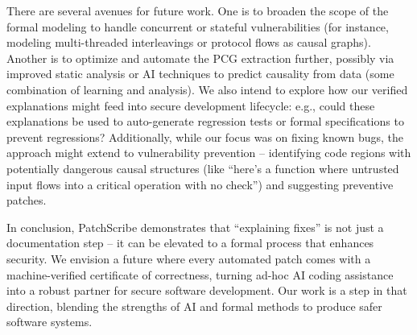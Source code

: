 \documentclass[conference,compsoc]{IEEEtran}
\begin{document}
There are several avenues for future work. One is to broaden the scope
of the formal modeling to handle concurrent or stateful vulnerabilities
(for instance, modeling multi-threaded interleavings or protocol flows
as causal graphs). Another is to optimize and automate the PCG
extraction further, possibly via improved static analysis or AI
techniques to predict causality from data (some combination of learning
and analysis). We also intend to explore how our verified explanations
might feed into secure development lifecycle: e.g., could these
explanations be used to auto-generate regression tests or formal
specifications to prevent regressions? Additionally, while our focus was
on fixing known bugs, the approach might extend to vulnerability
prevention -- identifying code regions with potentially dangerous causal
structures (like ``here's a function where untrusted input flows into a
critical operation with no check'') and suggesting preventive patches.

In conclusion, PatchScribe demonstrates that ``explaining fixes'' is not
just a documentation step -- it can be elevated to a formal process that
enhances security. We envision a future where every automated patch
comes with a machine-verified certificate of correctness, turning ad-hoc
AI coding assistance into a robust partner for secure software
development. Our work is a step in that direction, blending the
strengths of AI and formal methods to produce safer software systems.
\end{document}
